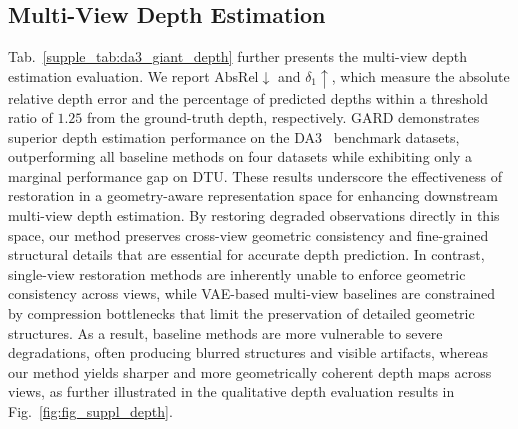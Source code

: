 \documentclass{llmxive}
\begin{document}
\subsection{Multi-View Depth Estimation}
Tab.~\ref{supple_tab:da3_giant_depth} further presents the multi-view depth estimation evaluation. We report AbsRel$\downarrow$ and $\delta_1\uparrow$, which measure the absolute relative depth error and the percentage of predicted depths within a threshold ratio of $1.25$ from the ground-truth depth, respectively. GARD demonstrates superior depth estimation performance on the DA3~\cite{depthanything3} benchmark datasets, outperforming all baseline methods on four datasets while exhibiting only a marginal performance gap on DTU. These results underscore the effectiveness of restoration in a geometry-aware representation space for enhancing downstream multi-view depth estimation. By restoring degraded observations directly in this space, our method preserves cross-view geometric consistency and fine-grained structural details that are essential for accurate depth prediction. In contrast, single-view restoration methods are inherently unable to enforce geometric consistency across views, while VAE-based multi-view baselines are constrained by compression bottlenecks that limit the preservation of detailed geometric structures. As a result, baseline methods are more vulnerable to severe degradations, often producing blurred structures and visible artifacts, whereas our method yields sharper and more geometrically coherent depth maps across views, as further illustrated in the qualitative depth evaluation results in Fig.~\ref{fig:fig_suppl_depth}.
\end{document}
